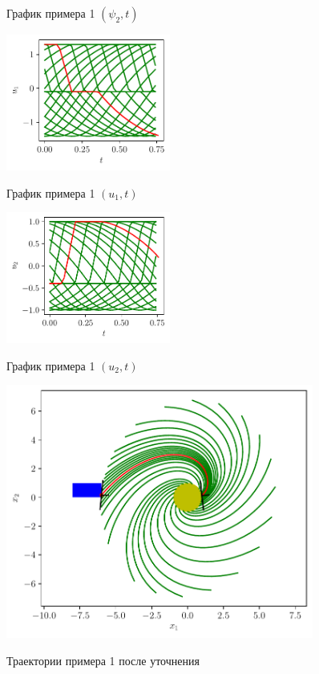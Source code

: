 \documentclass[12pt, a4paper]{article} %
\begin{document}
\begin{figure}[H]
\begin{multicols}{2}
\begin{centering}
            \label{fig:ex1_p2t}
            \caption{График примера 1 $(\psi_2, t)$}
        \end{centering} 
    \end{multicols}
    \vfill
    \begin{multicols}{2}
        \begin{centering}
            \includegraphics[width=0.48\textwidth]{figures/ex1_u1t.pdf}
            \label{fig:ex1_u1t}
            \caption{График примера 1 $(u_1, t)$}
            \hfill 
            \includegraphics[width=0.48\textwidth]{figures/ex1_u2t.pdf}
            \label{fig:ex1_u2t}
            \caption{График примера 1 $(u_2, t)$}
        \end{centering} 
    \end{multicols}
\end{figure} 

\begin{figure}[H]
    \centering
    \includegraphics[width=0.9\textwidth]{figures/ex1_x_clar.pdf}
    \label{fig:ex1_clar}
    \caption{Траектории примера 1 после уточнения}
\end{figure} 
\end{document}
